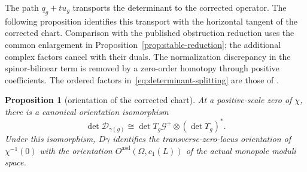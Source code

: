 \documentclass[11pt]{amsart}
\newtheorem{proposition}[theorem]{Proposition}
\theoremstyle{definition}
\theoremstyle{remark}
\theoremstyle{plain}
\newcommand{\cG}{\mathcal{G}}
\begin{document}
The path $q_g+t u_g$ transports the determinant to the corrected
operator.  The following proposition identifies this transport with
the horizontal tangent of the corrected chart.  Comparison with the
published obstruction reduction uses the common enlargement in
Proposition~\ref{prop:stable-reduction}; the additional complex factors
cancel with their duals.  The normalization discrepancy in the
spinor-bilinear term is removed by a zero-order homotopy through positive
coefficients.  The ordered factors in~\eqref{eq:determinant-splitting}
are those of \cite[Section~3.9]{FeehanLenessLevelOne}.

\begin{proposition}[orientation of the corrected chart]
\label{prop:chart-orientation}
At a positive-scale zero of $\chi$, there is a canonical orientation
isomorphism
\begin{equation}\label{eq:orientation-isomorphism}
 \det\mathscr D_{\gamma(g)}
 \cong\det T_g\cG^+\otimes(\det\Upsilon_g)^*.
\end{equation}
Under this isomorphism, $D\gamma$ identifies the transverse-zero-locus
orientation of $\chi^{-1}(0)$ with the orientation
$O^{\mathrm{asd}}(\Omega,c_1(L))$ of the actual monopole moduli space.
\end{proposition}
\end{document}
